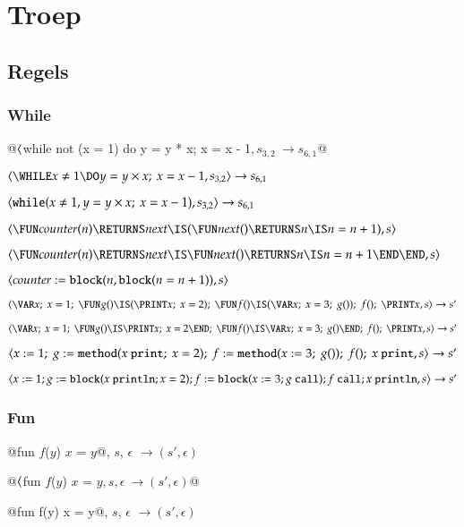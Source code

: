 \chapter{Troep}

\section{Regels}

\subsection{While}

@$\langle$while not (x = 1) do y = y * x; x = x - 1$, s_{3,2}\> \to s_{6,1}$@

$\<\WHILE x \neq 1 \DO y = y \times x;~ x = x - 1, s_{3,2}\> \to s_{6,1}$

$\langle\mathtt{while}(x \neq 1, y = y \times x;~ x = x - 1), s_{3,2}\rangle \to s_{6,1}$

$\<\FUN counter(n) \RETURNS next \IS (\FUN next() \RETURNS n \IS n = n + 1), s\>$

$\<\FUN counter(n) \RETURNS next \IS \FUN next() \RETURNS n \IS n = n + 1 \END \END, s\>$

$\langle counter := \mathtt{block}(n, \mathtt{block}(n = n + 1)), s\rangle$

$\<\VAR x\COMP x=1\COMP
   \FUN g() \IS (\PRINT x\COMP x=2)\COMP
   \FUN f() \IS (\VAR x\COMP x=3\COMP g())\COMP
   f()\COMP
   \PRINT x,
s\> \to s'$


$\<\VAR x\COMP x=1\COMP
   \FUN g() \IS \PRINT x\COMP x=2 \END\COMP
   \FUN f() \IS \VAR x\COMP x=3\COMP g() \END\COMP
   f()\COMP
   \PRINT x,
s\> \to s'$

$\langle x:=1;~
   g:=\mathtt{method}(x \mathtt{~print};~ x=2);~
   f:=\mathtt{method}(x:=3;~ g());~
   f();~
   x \mathtt{~print}, 
s\rangle \to s'$

$\langle x:=1;
   g:=\mathtt{block}(x \mathtt{~println}; x=2);
   f:=\mathtt{block}(x:=3; g \mathtt{~call});
   f \mathtt{~call};
   x \mathtt{~println}, 
s\rangle \to s'$

\subsection{Fun}

\<@fun $f$($y$) {$x$ = $y$}@, $s$, $\epsilon$\> $\to (s',\epsilon)$

@$\langle$fun $f$($y$) {$x$ = $y$}$, s, \epsilon\> \to (s',\epsilon)$@

\<@fun f(y) {x = y}@, $s$, $\epsilon$\> $\to (s',\epsilon)$

